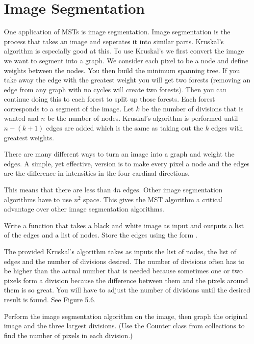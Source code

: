 
\section*{Image Segmentation}


One application of MSTs is image segmentation. Image segmentation is the process that takes an image and seperates it into similar parts.
Kruskal's algorithm is especially good at this. To use Kruskal's we first convert the image we want to segment into a graph. We consider each pixel to be a node and define weights between the nodes. You then build the minimum spanning tree. If you take away the edge with the greatest weight you will get two forests (removing an edge from any graph with no cycles will create two forests). Then you can continue doing this to each forest to split up those forests. Each forest corresponds to a segment of the image.
Let $k$ be the number of divisions that is wanted and $n$ be the number of nodes.
Kruskal's algorithm is performed until $n-(k+1)$ edges are added which is the same as taking out the $k$ edges with greatest weights.

There are many different ways to turn an image into a graph and weight the edges.
A simple, yet effective, version is to make every pixel a node and the edges are the difference in intensities in the four cardinal directions.


This means that there are less than $4n$ edges.
Other image segmentation algorithms have to use $n^2$ space.
This gives the MST algorithm a critical advantage over other image segmentation algorithms.

\begin{problem}
Write a function that takes a black and white image as input and outputs a list of the edges and a list of nodes.
Store the edges using the form .
\end{problem}

The provided Kruskal's algorithm takes as inputs the list of nodes, the list of edges and the number of divisions desired.
The number of divisions often has to be higher than the actual number that is needed because sometimes one or two pixels form a division because the difference between them and the pixels around them is so great.
You will have to adjust the number of divisions until the desired result is found.  See Figure 5.6.

\begin{problem}
Perform the image segmentation algorithm on the image, then graph the original image and the three largest divisions.
(Use the Counter class from collections to find the number of pixels in each division.)
\end{problem}

